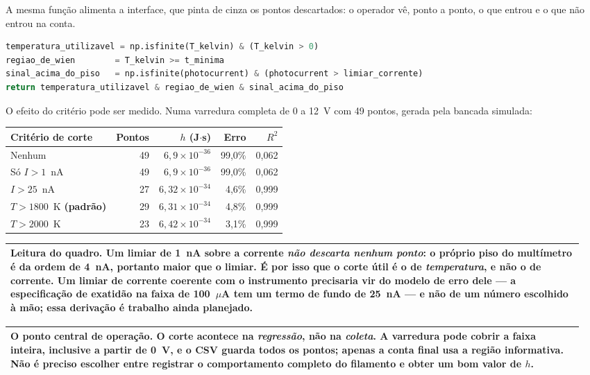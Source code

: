 \documentclass[11pt,a4paper]{article}
\newenvironment{nota}
  {\par\medskip\noindent\begin{tabular}{|p{0.96\linewidth}|}\hline\rule{0pt}{3ex}}
  {\\[1ex]\hline\end{tabular}\par\medskip}
\begin{document}
A mesma função alimenta a interface, que pinta de cinza os pontos descartados:
o operador vê, ponto a ponto, o que entrou e o que não entrou na conta.

\begin{lstlisting}[language=Python]
temperatura_utilizavel = np.isfinite(T_kelvin) & (T_kelvin > 0)
regiao_de_wien        = T_kelvin >= t_minima
sinal_acima_do_piso   = np.isfinite(photocurrent) & (photocurrent > limiar_corrente)
return temperatura_utilizavel & regiao_de_wien & sinal_acima_do_piso
\end{lstlisting}

O efeito do critério pode ser medido. Numa varredura completa de 0 a 12~V com
49 pontos, gerada pela bancada simulada:

\begin{center}
\begin{tabular}{@{}lrrrr@{}}
\toprule
\textbf{Critério de corte} & \textbf{Pontos} & \textbf{$h$ (J$\cdot$s)} & \textbf{Erro} & \textbf{$R^2$} \\
\midrule
Nenhum & 49 & $6{,}9 \times 10^{-36}$ & 99{,}0\% & 0{,}062 \\
Só $I > 1$~nA & 49 & $6{,}9 \times 10^{-36}$ & 99{,}0\% & 0{,}062 \\
$I > 25$~nA & 27 & $6{,}32 \times 10^{-34}$ & 4{,}6\% & 0{,}999 \\
$T > 1800$~K \textbf{(padrão)} & 29 & $6{,}31 \times 10^{-34}$ & 4{,}8\% & 0{,}999 \\
$T > 2000$~K & 23 & $6{,}42 \times 10^{-34}$ & 3{,}1\% & 0{,}999 \\
\bottomrule
\end{tabular}
\end{center}

\begin{nota}
\textbf{Leitura do quadro.} Um limiar de 1~nA sobre a corrente \emph{não
descarta nenhum ponto}: o próprio piso do multímetro é da ordem de 4~nA,
portanto maior que o limiar. É por isso que o corte útil é o de
\emph{temperatura}, e não o de corrente. Um limiar de corrente coerente com o
instrumento precisaria vir do modelo de erro dele --- a especificação de
exatidão na faixa de 100~$\mu$A tem um termo de fundo de 25~nA --- e não de um
número escolhido à mão; essa derivação é trabalho ainda planejado.
\end{nota}

\begin{nota}
\textbf{O ponto central de operação.} O corte acontece na \emph{regressão},
não na \emph{coleta}. A varredura pode cobrir a faixa inteira, inclusive a
partir de 0~V, e o CSV guarda todos os pontos; apenas a conta final usa a
região informativa. Não é preciso escolher entre registrar o comportamento
completo do filamento e obter um bom valor de $h$.
\end{nota}
\end{document}
